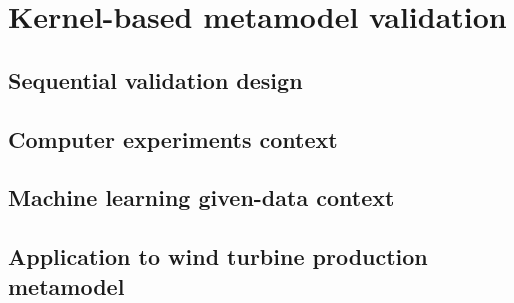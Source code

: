 \chapter{Kernel-based metamodel validation }
    \section{Sequential validation design}
    \section{Computer experiments context}
    \section{Machine learning given-data context}
    \section{Application to wind turbine production metamodel}